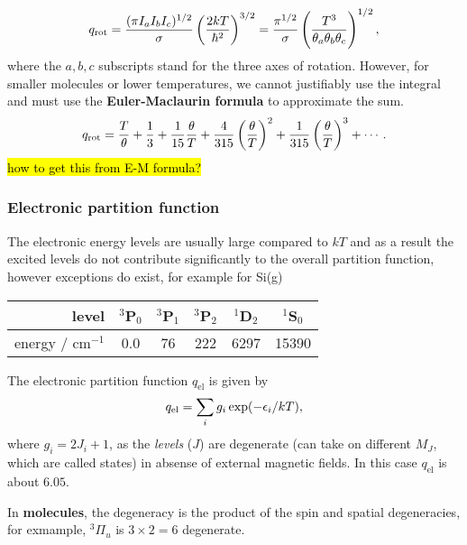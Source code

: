 \begin{equation}
q_{\text{rot}}=\frac{(\pi I_aI_bI_c)^{1/2}}{\sigma}\left(\frac{2kT}{\hbar^2} \right)^{3/2}=\frac{\pi^{1/2}}{\sigma}\left(\frac{T^3}{\theta_a\theta_b\theta_c} \right)^{1/2},
\end{equation}
where the $a,b,c$ subscripts stand for the three axes of rotation.
However, for smaller molecules or lower temperatures, we cannot justifiably 
use the integral and must use the \textbf{Euler-Maclaurin formula} to 
approximate the sum. 
\begin{equation}
q_{\text{rot}}=\frac{T}{\theta}+\frac{1}{3}+\frac{1}{15}\frac{\theta}{T}+\frac{4}{315}\left(\frac{\theta}{T}\right)^2+\frac{1}{315}\left(\frac{\theta}{T}\right)^3+\cdots.
\end{equation}
\hl{how to get this from E-M formula?}
\subsubsection{Electronic partition function}
The electronic energy levels are usually large compared to $kT$ and as a result the excited levels do not contribute significantly to the overall partition function, however exceptions do exist, for example for Si(g)
\begin{center}
\begin{tabular}{r|c c c c c}
level & $^3$P$_0$ & $^3$P$_1$ & $^3$P$_2$ & $^1$D$_2$ & $^1$S$_0$\\
\hline
energy / cm$^{-1}$ & 0.0 & 76 & 222 & 6297 & 15390
\end{tabular}
\end{center}
The electronic partition function $q_{\text{el}}$ is given by
\begin{equation}
q_{\text{el}}=\sum_{i}g_i\exp(-\epsilon_i/kT),
\end{equation}
where $g_i=2J_i+1$, as the \emph{levels} ($J$) are degenerate (can take on different $M_J$, which are called states) in absense of external magnetic fields.
In this case $q_{\text{el}}$ is about $6.05$.\par
In \textbf{molecules}, the degeneracy is the product of the spin and spatial degeneracies, for exmample, $^3\Pi_u$ is $3\times 2=6$ degenerate.







